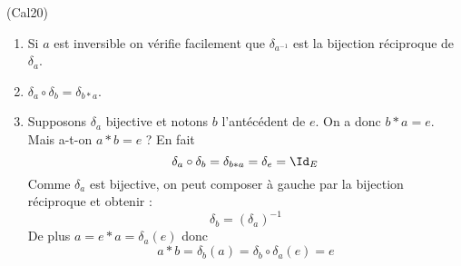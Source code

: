 \begin{tiny}(Cal20)\end{tiny} 
\begin{enumerate}
 \item Si $a$ est inversible on vérifie facilement que $\delta_{a^{-1}}$ est la bijection réciproque de $\delta_a$.
\item $\delta_a \circ \delta_b = \delta_{b*a}$.
\item Supposons $\delta_a$ bijective et notons $b$ l'antécédent de $e$. On a donc $b * a=e$. Mais a-t-on $a*b=e$ ?\newline
En fait
\begin{displaymath}
 \delta_a \circ \delta_b = \delta_{b*a} = \delta_e = \Id_E
\end{displaymath}
Comme $\delta_a$ est bijective, on peut composer à gauche par la bijection réciproque et obtenir :
\begin{displaymath}
 \delta_b = \left( \delta_a\right)^{-1} 
\end{displaymath}
De plus $a=e*a=\delta_a(e)$ donc
\begin{displaymath}
 a*b = \delta_b(a)=\delta_b \circ \delta_a (e) = e
\end{displaymath}
\end{enumerate}
